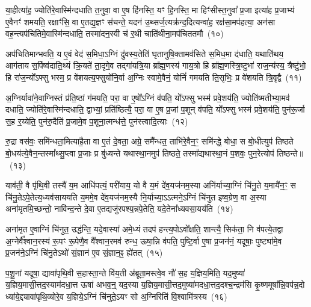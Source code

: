 या॒हीत्या॑ह॒ ज्योति॑रे॒वास्मि॑न्दधाति त॒नुवा॒ वा ए॒ष हि॑नस्ति॒ यꣳ हि॒नस्ति॒ मा हिꣳ॑सीस्त॒नुवा᳚ प्र॒जा इत्या॑ह प्र॒जाभ्य॑ ए॒वैनꣳ॑ शमयति॒ रक्षाꣳ॑सि॒ वा ए॒तद्य॒ज्ञꣳ स॑चन्ते॒ यदन॑ उ॒थ्सर्ज॒त्यक्र॑न्द॒दित्यन्वा॑ह॒ रक्ष॑सा॒मप॑हत्या॒ अन॑सा वह॒न्त्यप॑चितिमे॒वास्मि॑न्दधाति॒ तस्मा॑दन॒स्वी च॑ र॒थी चाति॑थीना॒मप॑चिततमौ~(१०)

अप॑चितिमान्भवति॒ य ए॒वं वेद॑ स॒मिधा॒\-ऽग्निं दु॑वस्य॒तेति॑ घृतानुषि॒क्तामव॑सिते स॒मिध॒मा द॑धाति॒ यथाति॑थय॒ आग॑ताय स॒र्पिष्व॑दाति॒थ्यं क्रि॒यते॑ ता॒दृगे॒व तद्गा॑यत्रि॒या ब्रा᳚ह्म॒णस्य॑ गाय॒त्रो हि ब्रा᳚ह्म॒णस्त्रि॒ष्टुभा॑ राज॒न्य॑स्य॒ त्रैष्टु॑भो॒ हि रा॑ज॒न्यो᳚\-ऽफ्सु भस्म॒ प्र वे॑शयत्य॒फ्सुयो॑नि॒र्वा अ॒ग्निः स्वामे॒वैनं॒ योनिं॑ गमयति ति॒सृभिः॒ प्र वे॑शयति त्रि॒वृद्वै~(११)

अ॒ग्निर्यावा॑ने॒वाग्निस्तं प्र॑ति॒ष्ठां ग॑मयति॒ परा॒ वा ए॒षो᳚\-ऽग्निं व॑पति॒ यो᳚\-ऽफ्सु भस्म॑ प्रवे॒शय॑ति॒ ज्योति॑ष्मतीभ्या॒मव॑ दधाति॒ ज्योति॑रे॒वास्मि॑न्दधाति॒ द्वाभ्यां॒ प्रति॑ष्ठित्यै॒ परा॒ वा ए॒ष प्र॒जां प॒शून् व॑पति॒ यो᳚\-ऽफ्सु भस्म॑ प्रवे॒शय॑ति॒ पुन॑रू॒र्जा स॒ह र॒य्येति॒ पुन॑रु॒दैति॑ प्र॒जामे॒व प॒शूना॒त्मन्ध॑त्ते॒ पुन॑स्त्वादि॒त्याः~(१२)

रु॒द्रा वस॑वः॒ समि॑न्धता॒मित्या॑है॒ता वा ए॒तं दे॒वता॒ अग्रे॒ समै᳚न्धत॒ ताभि॑रे॒वैन॒ꣳ॒ समि॑न्द्धे॒ बोधा॒ स बो॒धीत्युप॑ तिष्ठते बो॒धय॑त्ये॒वैन॒न्तस्मा᳚थ्सु॒प्त्वा प्र॒जाः प्र बु॑ध्यन्ते यथास्था॒नमुप॑ तिष्ठते॒ तस्मा᳚द्यथास्था॒नं प॒शवः॒ पुन॒रेत्योप॑ तिष्ठन्ते॥~(१३)

{}%

याव॑ती॒ वै पृ॑थि॒वी तस्यै॑ य॒म आधि॑पत्यं॒ परी॑याय॒ यो वै य॒मं दे॑व॒यज॑नम॒स्या अनि॑र्याच्या॒ग्निं चि॑नु॒ते य॒मायै॑न॒ꣳ॒ स चि॑नु॒ते\-ऽपे॒तेत्य॒ध्यव॑साययति य॒ममे॒व दे॑व॒यज॑नम॒स्यै नि॒र्याच्या॒\-ऽऽ\-त्मने॒\-ऽग्निं चि॑नुत इष्व॒ग्रेण॒ वा अ॒स्या अना॑मृतमि॒च्छन्तो॒ नावि॑न्द॒न्ते दे॒वा ए॒तद्यजु॑रपश्य॒न्नपे॒तेति॒ यदे॒तेना᳚ध्यवसा॒यय॑ति~(१४)

अना॑मृत ए॒वाग्निं चि॑नुत॒ उद्ध॑न्ति॒ यदे॒वास्या॑ अमे॒ध्यं तदप॑ हन्त्य॒पो\-ऽवो᳚क्षति॒ शान्त्यै॒ सिक॑ता॒ नि व॑पत्ये॒तद्वा अ॒ग्नेर्वै᳚श्वान॒रस्य॑ रू॒पꣳ रू॒पेणै॒व वै᳚श्वान॒रमव॑ रुन्ध॒ ऊषा॒न्नि व॑पति॒ पुष्टि॒र्वा ए॒षा प्र॒जन॑नं॒ यदूषाः॒ पुष्ट्या॑मे॒व प्र॒जन॑ने॒\-ऽग्निं चि॑नु॒ते\-ऽथो॑ सं॒ज्ञान॑ ए॒व सं॒ज्ञान॒ꣴ॒ ह्ये॑तत्~(१५)

प॒शू॒नां यदूषा॒ द्यावा॑\-पृथि॒वी स॒हास्ता॒न्ते वि॑य॒ती अ॑ब्रूता॒मस्त्वे॒व नौ॑ स॒ह य॒ज्ञिय॒मिति॒ यद॒मुष्या॑ य॒ज्ञिय॒मासी॒त्तद॒स्याम॑दधा॒त्त ऊषा॑ अभव॒न्॒ यद॒स्या य॒ज्ञिय॒मासी॒त्तद॒मुष्या॑मदधा॒त्तद॒दश्च॒न्द्रम॑सि कृ॒ष्णमूषा᳚न्नि॒वप॑न्न॒दो ध्या॑ये॒द्द्यावा॑पृथि॒व्योरे॒व य॒ज्ञिये॒\-ऽग्निं चि॑नुते॒\-ऽयꣳ सो अ॒ग्निरिति॑ वि॒श्वामि॑त्रस्य~(१६)

